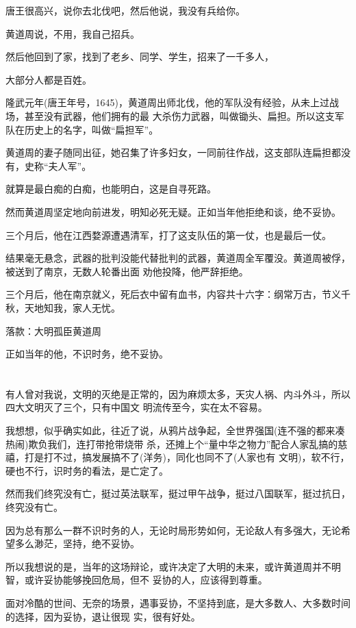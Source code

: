 \documentclass[11pt,a4paper,onecolumn]{article}
\begin{document}
唐王很高兴，说你去北伐吧，然后他说，我没有兵给你。

黄道周说，不用，我自己招兵。

然后他回到了家，找到了老乡、同学、学生，招来了一千多人，

大部分人都是百姓。

隆武元年(唐王年号，1645)，黄道周出师北伐，他的军队没有经验，从未上过战场，甚至没有武器，他们拥有的最
大杀伤力武器，叫做锄头、扁担。所以这支军队在历史上的名字，叫做``扁担军''。

黄道周的妻子随同出征，她召集了许多妇女，一同前往作战，这支部队连扁担都没有，史称``夫人军''。

就算是最白痴的白痴，也能明白，这是自寻死路。

然而黄道周坚定地向前进发，明知必死无疑。正如当年他拒绝和谈，绝不妥协。

三个月后，他在江西婺源遭遇清军，打了这支队伍的第一仗，也是最后一仗。

结果毫无悬念，武器的批判没能代替批判的武器，黄道周全军覆没。黄道周被俘，被送到了南京，无数人轮番出面
劝他投降，他严辞拒绝。

三个月后，他在南京就义，死后衣中留有血书，内容共十六字：纲常万古，节义千秋，天地知我，家人无忧。

落款：大明孤臣黄道周

正如当年的他，不识时务，绝不妥协。

\section[\thesection]{}

有人曾对我说，文明的灭绝是正常的，因为麻烦太多，天灾人祸、内斗外斗，所以四大文明灭了三个，只有中国文
明流传至今，实在太不容易。

我想想，似乎确实如此，往近了说，从鸦片战争起，全世界强国(连不强的都来凑热闹)欺负我们，连打带抢带烧带
杀，还摊上个``量中华之物力''配合人家乱搞的慈禧，打是打不过，搞发展搞不了(洋务)，同化也同不了(人家也有
文明)，软不行，硬也不行，识时务的看法，是亡定了。

然而我们终究没有亡，挺过英法联军，挺过甲午战争，挺过八国联军，挺过抗日，终究没有亡。

因为总有那么一群不识时务的人，无论时局形势如何，无论敌人有多强大，无论希望多么渺茫，坚持，绝不妥协。

所以我想说的是，当年的这场辩论，或许决定了大明的未来，或许黄道周并不明智，或许妥协能够挽回危局，但不
妥协的人，应该得到尊重。

面对冷酷的世间、无奈的场景，遇事妥协，不坚持到底，是大多数人、大多数时间的选择，因为妥协，退让很现
实，很有好处。
\end{document}
